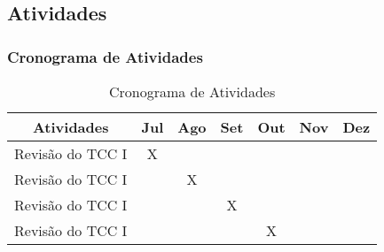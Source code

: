 
\subsection{\textbf{Atividades}}
    \label{sec:atividades}
    
    \subsubsection{Cronograma de Atividades}
        \label{subsec:cronograma-atividades}
        
        
        \begin{table}[h]
        \caption{Cronograma de Atividades}
        \centering
        \begin{tabular}{c c c c c c c} \hline
            \label{quad:cronograma-atividades}
            \textbf{Atividades} & \textbf{Jul} & \textbf{Ago} & \textbf{Set} & \textbf{Out} & \textbf{Nov} & \textbf{Dez} \\ \hline
            Revisão do TCC I        & X &   &   &   &   &   \\ \hline
            Revisão do TCC I        &   & X &   &   &   &   \\ \hline
            Revisão do TCC I        &   &   & X &   &   &   \\ \hline
            Revisão do TCC I        &  &   &   &  X &   &   \\ \hline
              
        \end{tabular}
    \end{table}